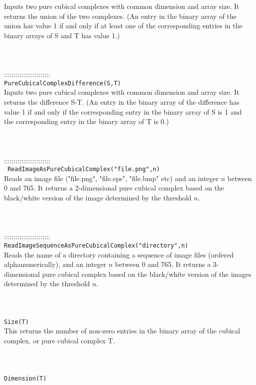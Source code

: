 \documentclass[a4paper,11pt]{report}
\begin{document}
{ Inputs two pure cubical complexes with common dimension and array size. It
returns the union of the two complexes. (An entry in the binary array of the
union has value 1 if and only if at least one of the corresponding entries in
the binary arrays of S and T has value 1.) \\
 \\
 \\
 \\
 ::::::::::::::::::::::::\\
 \texttt{PureCubicalComplexDifference(S,T)}\\
 

 Inputs two pure cubical complexes with common dimension and array size. It
returns the difference S-T. (An entry in the binary array of the difference
has value 1 if and only if the corresponding entry in the binary array of S is
1 and the corresponding entry in the binary array of T is 0.) \\
 \\
 \\
 \\
 ::::::::::::::::::::::::\\
 \texttt{ ReadImageAsPureCubicalComplex("file.png",n)}\\
 

 Reads an image file ("file.png", "file.eps", "file.bmp" etc) and an integer $n$ between 0 and 765. It returns a 2-dimensional pure cubical complex based on
the black/white version of the image determined by the threshold $n$. \\
 \\
 \\
 \\
 ::::::::::::::::::::::::\\
 \texttt{ReadImageSequenceAsPureCubicalComplex("directory",n)}\\
 

 Reads the name of a directory containing a sequence of image files (ordered
alphanumerically), and an integer $n$ between 0 and 765. It returns a 3-dimensional pure cubical complex based on
the black/white version of the images determined by the threshold $n$. \\
 \\
 \\
 \\
 \texttt{Size(T)}\\
 

 This returns the number of non-zero entries in the binary array of the cubical
complex, or pure cubical complex T. \\
 \\
 \\
 \\
 \texttt{Dimension(T)}\\
 

}
\end{document}
